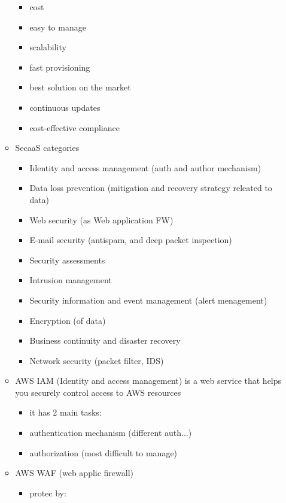 \documentclass{article}
\begin{document}
\begin{itemize}
\begin{itemize}
\begin{itemize}
            \item cost
            \item easy to manage
            \item scalability
            \item fast provisioning
            \item best solution on the market
            \item continuous updates
            \item cost-effective compliance
        \end{itemize}
        \item SecaaS categories
        \begin{itemize}
            \item Identity and access management (auth and author mechanism)
            \item Data loss prevention (mitigation and recovery strategy releated to data)
            \item Web security (as Web application FW)
            \item E-mail security (antispam, and deep packet inspection)
            \item Security assessments
            \item Intrusion management
            \item Security information and event management (alert menagement)
            \item Encryption (of data)
            \item Business continuity and disaster recovery
            \item Network security (packet filter, IDS)
        \end{itemize}
        \item AWS IAM (Identity and access management)  is a web service that helps you securely control access to AWS resources
        \begin{itemize}
            \item it has 2 main tasks:
            \item authentication mechanism (different auth...)
            \item authorization (most difficult to manage)
        \end{itemize}
        \item AWS WAF (web applic firewall)
        \begin{itemize}
            \item protec by:
            \begin{itemize}

\end{itemize}
\end{itemize}
\end{itemize}
\end{itemize}
\end{document}
